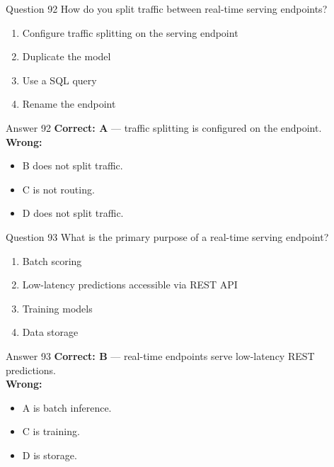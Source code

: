 \documentclass[aspectratio=169,11pt]{beamer}
\begin{document}
	\begin{frame}{Question 92}
		How do you split traffic between real-time serving endpoints?
		\begin{enumerate}[label=\Alph*.]
			\item Configure traffic splitting on the serving endpoint
			\item Duplicate the model
			\item Use a SQL query
			\item Rename the endpoint
		\end{enumerate}
	\end{frame}
	\begin{frame}{Answer 92}
		\textbf{Correct: A} --- traffic splitting is configured on the endpoint.\\
		\vspace{0.5em}
		\textbf{Wrong:}
		\begin{itemize}
			\item B does not split traffic.
			\item C is not routing.
			\item D does not split traffic.
		\end{itemize}
	\end{frame}
	
	\begin{frame}{Question 93}
		What is the primary purpose of a real-time serving endpoint?
		\begin{enumerate}[label=\Alph*.]
			\item Batch scoring
			\item Low-latency predictions accessible via REST API
			\item Training models
			\item Data storage
		\end{enumerate}
	\end{frame}
	\begin{frame}{Answer 93}
		\textbf{Correct: B} --- real-time endpoints serve low-latency REST predictions.\\
		\vspace{0.5em}
		\textbf{Wrong:}
		\begin{itemize}
			\item A is batch inference.
			\item C is training.
			\item D is storage.
		\end{itemize}
	\end{frame}
	
\end{document}
